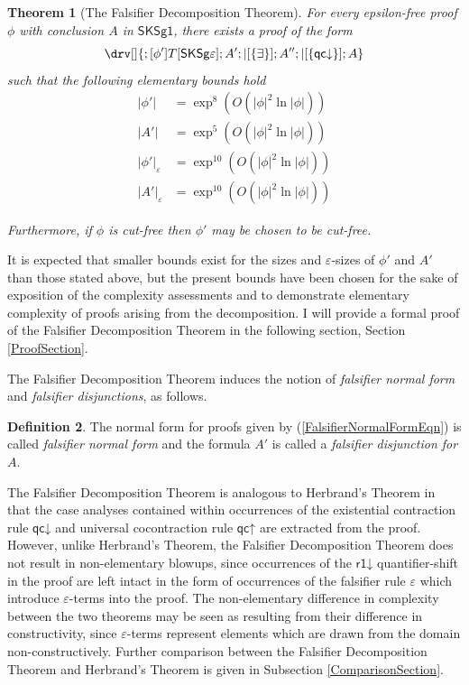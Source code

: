 \documentclass[10pt]{article}
\newtheorem{theorem}{Theorem}[section]
\theoremstyle{definition}\newtheorem{remark}[theorem]{Remark}
\theoremstyle{definition}\newtheorem{example}[theorem]{Example}
\theoremstyle{definition}\newtheorem{definition}[theorem]{Definition}
\newcommand{\SKSq}{{\mathsf{SKSg1}}}
\newcommand{\FalsifierCalculus}{{\mathsf{SKSg\varepsilon}}}
\newcommand{\qcUp}{{\mathsf{qc\mathord\uparrow}}}
\newcommand{\qcDown}{{\mathsf{qc\mathord\downarrow}}}
\newcommand{\rOneDown}{{\mathsf{r1\mathord\downarrow}}}
\newcommand{\falsifierRule}{{\mathsf{\varepsilon}}}
\begin{document}
	\begin{theorem}[The Falsifier Decomposition Theorem]\label{FalsifierNormalForm}
		For every epsilon-free proof $\phi$ with conclusion $A$ in $\SKSq$, there exists a proof of the form
		\begin{equation}\label{FalsifierNormalFormEqn}
			\drv[] {
				; [\phi']T[\FalsifierCalculus] ; A' ; |[\{\exists\}] ; A'' ; |[\{\qcDown\}] ; A
			}
		\end{equation}
		such that the following elementary bounds hold
		\begin{align*}
			| \phi' | &= \exp^8 (O(| \phi |^2 \ln | \phi |)) \\
			| A' | &= \exp^5 (O(| \phi |^2 \ln | \phi |)) \\
			| \phi' |_\varepsilon &=  \exp^{10} (O(| \phi |^2 \ln | \phi |)) \\
			| A' |_\varepsilon &= \exp^{10} (O(| \phi |^2 \ln | \phi |))
		\end{align*}
		
		Furthermore, if $\phi$ is cut-free then $\phi'$ may be chosen to be cut-free.
	\end{theorem}
	
	It is expected that smaller bounds exist for the sizes and $\varepsilon$-sizes of $\phi'$ and $A'$ than those stated above, but the present bounds have been chosen for the sake of exposition of the complexity assessments and to demonstrate elementary complexity of proofs arising from the decomposition. I will provide a formal proof of the Falsifier Decomposition Theorem in the following section, Section \ref{ProofSection}.
	
	The Falsifier Decomposition Theorem induces the notion of \textit{falsifier normal form} and \textit{falsifier disjunctions}, as follows.
	
	\begin{definition}
		The normal form for proofs given by (\ref{FalsifierNormalFormEqn}) is called \textit{falsifier normal form} and the formula $A'$ is called a \textit{falsifier disjunction for $A$}.
	\end{definition}

	The Falsifier Decomposition Theorem is analogous to Herbrand's Theorem in that the case analyses contained within occurrences of the existential contraction rule $\qcDown$ and universal cocontraction rule $\qcUp$ are extracted from the proof. However, unlike Herbrand's Theorem, the Falsifier Decomposition Theorem does not result in non-elementary blowups, since occurrences of the $\rOneDown$ quantifier-shift in the proof are left intact in the form of occurrences of the falsifier rule $\falsifierRule$ which introduce $\varepsilon$-terms into the proof. The non-elementary difference in complexity between the two theorems may be seen as resulting from their difference in constructivity, since $\varepsilon$-terms represent elements which are drawn from the domain non-constructively. Further comparison between the Falsifier Decomposition Theorem and Herbrand's Theorem is given in Subsection \ref{ComparisonSection}.
\end{document}
